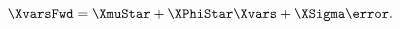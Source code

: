 \begin{equation} \label{eq:nXvarsQ}
	\XvarsFwd = \XmuStar + \XPhiStar \Xvars  + \XSigma \error.
\end{equation}